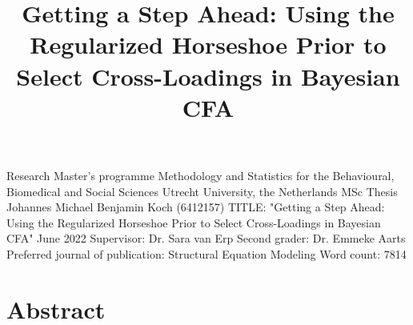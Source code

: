 \documentclass[
  man, donotrepeattitle,floatsintext]{apa6}
\title{Getting a Step Ahead: Using the Regularized Horseshoe Prior to Select Cross-Loadings in Bayesian CFA}
\author{\phantom{0}}
\date{}
\affiliation{\phantom{0}}
\begin{document}
\maketitle

\thispagestyle{empty}

\begin{large}
\noindent Research Master's programme 
Methodology and Statistics for the Behavioural, Biomedical and Social Sciences \newline
Utrecht University, the Netherlands \newline
\newline
\newline
\newline
\newline
MSc Thesis Johannes Michael Benjamin Koch (6412157) 
\newline
TITLE: "Getting a Step Ahead: Using the Regularized Horseshoe Prior to Select Cross-Loadings in Bayesian CFA"
\newline
June 2022 
\newline
\newline
\newline
\newline
\newline
Supervisor:\newline
Dr. Sara van Erp \newline
\newline
\newline
Second grader: \newline
Dr. Emmeke Aarts
\newline
\newline
\newline
\newline
Preferred journal of publication: Structural Equation Modeling
\newline
Word count: 7814
\newline
\end{large}
\addtocounter{page}{-1}
\clearpage
\pagebreak

\setcounter{page}{0}
\thispagestyle{empty}
\pagestyle{plain}

\clearpage

\hypertarget{abstract}{%
\section{Abstract}\label{abstract}}
\end{document}
